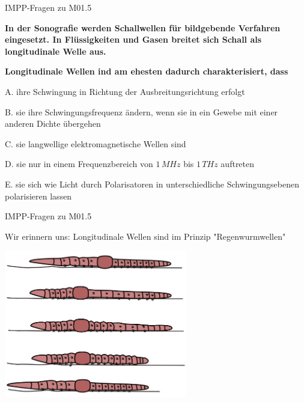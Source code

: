 \documentclass{beamer}
\begin{document}
\begin{frame}{IMPP-Fragen zu M01.5}
    
    \textbf{In der Sonografie werden Schallwellen für bildgebende Verfahren eingesetzt. In Flüssigkeiten und Gasen breitet sich Schall als longitudinale Welle aus.}
    
    \textbf{
    Longitudinale Wellen ind am ehesten dadurch charakterisiert, dass 
    } \\[0.2 cm]

\begin{description}
\item{A.} ihre Schwingung in Richtung der Ausbreitungsrichtung erfolgt %
\item{B.} sie ihre Schwingungsfrequenz ändern, wenn sie in ein Gewebe mit einer anderen Dichte übergehen
\item{C.} sie langwellige elektromagnetische Wellen sind
\item{D.} sie nur in einem Frequenzbereich von \(1\,MHz\) bis \(1\,THz\) auftreten
\item{E.} sie sich wie Licht durch Polarisatoren in unterschiedliche Schwingungsebenen polarisieren lassen

\end{description}
    
\end{frame}

\begin{frame}{IMPP-Fragen zu M01.5}
    
    

Wir erinnern uns: Longitudinale Wellen sind im Prinzip "Regenwurmwellen" 

\begin{center}
\includegraphics[width=0.6\textwidth]{regenwurm.png}
\end{center}






\end{frame}
\end{document}
